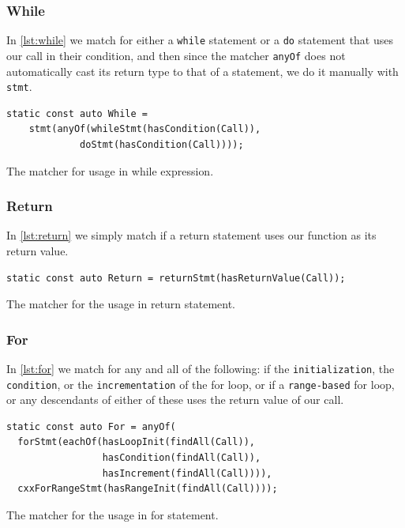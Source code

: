 \subsubsection{While}

In \cref{lst:while} we match
for either a \texttt{while} statement or a \texttt{do} statement that uses our call in their condition, and then since the matcher
\texttt{anyOf} does not automatically cast its return type to that of a statement, we do it manually with \texttt{stmt}.

\begin{listing}[H]
  \begin{verbatim}
static const auto While =
	stmt(anyOf(whileStmt(hasCondition(Call)),
             doStmt(hasCondition(Call))));
  \end{verbatim}
  \caption{The matcher for usage in while expression.}\label{lst:while}
\end{listing}

\subsubsection{Return}

In \cref{lst:return} we simply match if a return statement uses our function as its return value.

\begin{listing}[H]
  \begin{verbatim}
static const auto Return = returnStmt(hasReturnValue(Call));
  \end{verbatim}
  \caption{The matcher for the usage in return statement.}\label{lst:return}
\end{listing} %

\subsubsection{For}

In \cref{lst:for} we match for
any and all of the following: if the \texttt{initialization}, the \texttt{condition}, or the \texttt{incrementation} of the for
loop, or if a \texttt{range-based} for loop, or any descendants of either of these uses the return value of our call.

\begin{listing}[H]
  \begin{verbatim}
static const auto For = anyOf(
  forStmt(eachOf(hasLoopInit(findAll(Call)),
                 hasCondition(findAll(Call)),
                 hasIncrement(findAll(Call)))),
  cxxForRangeStmt(hasRangeInit(findAll(Call))));
  \end{verbatim}
  \caption{The matcher for the usage in for statement.}\label{lst:for}
\end{listing}

